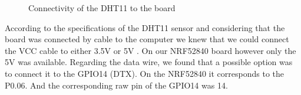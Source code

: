 \begin{figure}[!ht]
    \caption{Connectivity of the DHT11 to the board}%
    \label{fig:example}%
\end{figure}
According to the specifications of the DHT11 sensor and considering that the board was connected by cable to the computer we knew that we could connect the VCC cable to either 3.5V or 5V \cite{b1}. On our NRF52840 board however only the 5V was available. 
Regarding the data wire, we found that a possible option was to connect it to the GPIO14 (DTX)\cite{b2}. On the NRF52840 it corresponds to the P0.06. And the corresponding raw pin of the GPIO14 was 14. 

